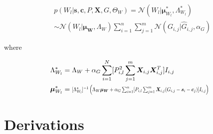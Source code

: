 \documentclass[10pt]{proc}
\begin{document}
\begin{mdframed}[style=eqbox]
{\setlength{\mathindent}{0cm}
\begin{equation} \label{cpd-W}
\begin{aligned}
    &p(W_l | \bm{s}, \bm{c}, P, \bm{X}, G, \Theta_W) =
        \mathcal{N}(W_l | \bm{\mu}_{W_l}^*, \Lambda_{W_l}^*) \\
        & \sim \mathcal{N}(W_l | \bm{\mu_W}, \Lambda_W)
            \sum_{i=1}^n \sum_{j=1}^m
                \mathcal{N}(G_{i,j} | \hat{G}_{i,j}, \alpha_G)
\end{aligned}
\end{equation}

where

\begin{align}
    \Lambda_{W_l}^* &= \begin{aligned}[t]
        \Lambda_W + \alpha_G \sum_{i=1}^N
            [ P_{i,l}^2 \sum_{j=1}^m
                \bm{X}_{i,j} \bm{X}_{i,j}^T ] I_{i,j}
    \end{aligned}\\
%
    \bm{\mu}_{W_l}^* &= \begin{aligned}[t]
        \vstretch{0.8}{\hstretch{0.7}{
            [\Lambda_{W_l}^*]^{-1} \left(
                \Lambda_W\bm{\mu_W} +
                \alpha_G \sum_{i=1}^n
                    [P_{i,l} \sum_{j=1}^m
                        \bm{X}_{i,j}(G_{i,j} - \bm{s}_i - \bm{c}_j)
                    ] I_{i,j}
            \right)}}
    \end{aligned}
\end{align}}
\end{mdframed}


\section{Derivations}\label{derivations}

\setlength{\belowdisplayskip}{6pt} \setlength{\belowdisplayshortskip}{6pt}
\setlength{\abovedisplayskip}{8pt} \setlength{\abovedisplayshortskip}{8pt}
\end{document}
